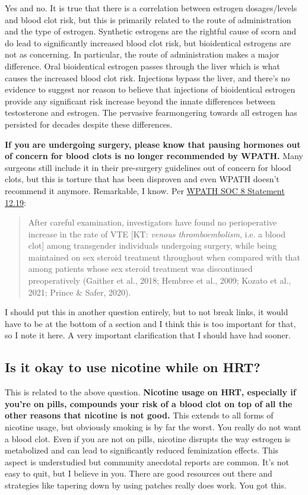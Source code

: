 \documentclass{article}
\begin{document}
{{Yes and no. It is true that there is a correlation between estrogen dosages/levels and blood clot risk, but this is primarily related to the route of administration and the type of estrogen. Synthetic estrogens are the rightful cause of scorn and do lead to significantly increased blood clot risk, but bioidentical estrogens are not as concerning. In particular, the route of administration makes a major difference. Oral bioidentical estrogen passes through the liver which is what causes the increased blood clot risk. Injections bypass the liver, and there's no evidence to suggest nor reason to believe that injections of bioidentical estrogen provide any significant risk increase beyond the innate differences between testosterone and estrogen. The pervasive fearmongering towards all estrogen has persisted for decades despite these differences.

\textbf{If you are undergoing surgery, please know that pausing hormones out of concern for blood clots is no longer recommended by WPATH.} Many surgeons still include it in their pre-surgery guidelines out of concern for blood clots, but this is torture that has been disproven and even WPATH doesn't recommend it anymore. Remarkable, I know. Per \href{https://www.tandfonline.com/doi/pdf/10.1080/26895269.2022.2100644}{WPATH SOC 8 Statement 12.19}: \blockquote{After careful examination, investigators have found no perioperative increase in the rate of VTE [KT: \textit{venous thromboembolism}, i.e. a blood clot] among transgender individuals undergoing surgery, while being maintained on sex steroid treatment throughout when compared with that among patients whose sex steroid treatment was discontinued preoperatively (Gaither et al., 2018; Hembree et al., 2009; Kozato et al., 2021; Prince \& Safer, 2020).} I should put this in another question entirely, but to not break links, it would have to be at the bottom of a section and I think this is too important for that, so I note it here. A very important clarification that I should have had sooner.

\subsection{Is it okay to use nicotine while on HRT?}\label{11-2}

This is related to the above question. \textbf{Nicotine usage on HRT, especially if you’re on pills, compounds your risk of a blood clot on top of all the other reasons that nicotine is not good.} This extends to all forms of nicotine usage, but obviously smoking is by far the worst. You really do not want a blood clot. Even if you are not on pills, nicotine disrupts the way estrogen is metabolized and can lead to significantly reduced feminization effects. This aspect is understudied but community anecdotal reports are common. It’s not easy to quit, but I believe in you. There are good resources out there and strategies like tapering down by using patches really does work. You got this.

}}
\end{document}
